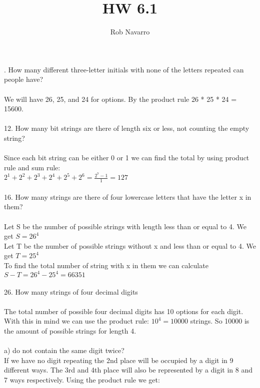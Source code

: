 \documentclass[11pt, oneside]{article}   	%
\title{HW 6.1}
\author{Rob Navarro}
\begin{document}
\maketitle

. How many different three-letter initials with none of the letters repeated can people have?\\\\
We will have 26, 25, and 24 for options. By the product rule 26 * 25 * 24 = 15600. \\\\
12. How many bit strings are there of length six or less, not counting the empty string?\\\\
Since each bit string can be either 0 or 1 we can find the total by using product rule and sum rule:\\
$2^1 + 2^2 + 2^3 + 2^4 + 2^5 + 2^6 = \frac{2^7 - 1}{1} = 127$\\\\
16. How many strings are there of four lowercase letters that have the letter x in them?\\\\
Let S be the number of possible strings with length less than or equal to 4. We get $S = 26^4$\\
Let T be the number of possible strings without x and less than or equal to 4. We get $T = 25^4$\\
To find the total number of string with x in them we can calculate $S - T = 26^4 - 25^4 = 66351$\\\\
26. How many strings of four decimal digits\\\\
The total number of possible four decimal digits has 10 options for each digit. With this in mind we can use the product rule: $10^4 = 10000$ strings. So 10000 is the amount of possible strings for length 4. \\\\
a) do not contain the same digit twice?\\
If we have no digit repeating the 2nd place will be occupied by a digit in 9 different ways. The 3rd and 4th place will also be represented by a digit in 8 and 7 ways respectively. Using the product rule we get:\\
\end{document}
